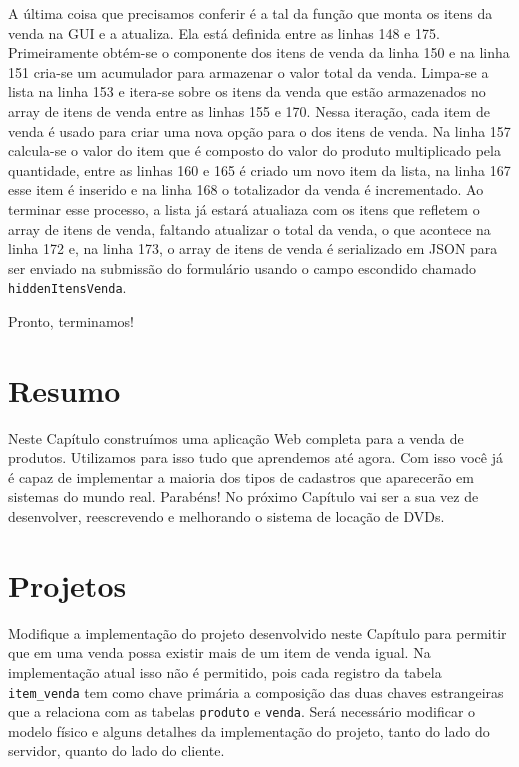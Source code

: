 A última coisa que precisamos conferir é a tal da função que monta os itens da venda na GUI e a atualiza. Ela está definida entre as linhas 148 e 175. Primeiramente obtém-se o componente dos itens de venda da linha 150 e na linha 151 cria-se um acumulador para armazenar o valor total da venda. Limpa-se a lista na linha 153 e itera-se sobre os itens da venda que estão armazenados no array de itens de venda entre as linhas 155 e 170. Nessa iteração, cada item de venda é usado para criar uma nova opção para o  dos itens de venda. Na linha 157 calcula-se o valor do item que é composto do valor do produto multiplicado pela quantidade, entre as linhas 160 e 165 é criado um novo item da lista, na linha 167 esse item é inserido e na linha 168 o totalizador da venda é incrementado. Ao terminar esse processo, a lista já estará atualiaza com os itens que refletem o array de itens de venda, faltando atualizar o total da venda, o que acontece na linha 172 e, na linha 173, o array de itens de venda é serializado em JSON para ser enviado na submissão do formulário usando o campo escondido chamado \texttt{hiddenItensVenda}.

Pronto, terminamos!


\section{Resumo}

Neste Capítulo construímos uma aplicação Web completa para a venda de produtos. Utilizamos para isso tudo que aprendemos até agora. Com isso você já é capaz de implementar a maioria dos tipos de cadastros que aparecerão em sistemas do mundo real. Parabéns! No próximo Capítulo vai ser a sua vez de desenvolver, reescrevendo e melhorando o sistema de locação de DVDs. 


\section{Projetos}

\begin{projetoSemArquivo}{}{}{}
    Modifique a implementação do projeto desenvolvido neste Capítulo para permitir que em uma venda possa existir mais de um item de venda igual. Na implementação atual isso não é permitido, pois cada registro da tabela \texttt{item\_venda} tem como chave primária a composição das duas chaves estrangeiras que a relaciona com as tabelas \texttt{produto} e \texttt{venda}. Será necessário modificar o modelo físico e alguns detalhes da implementação do projeto, tanto do lado do servidor, quanto do lado do cliente.
\end{projetoSemArquivo}


